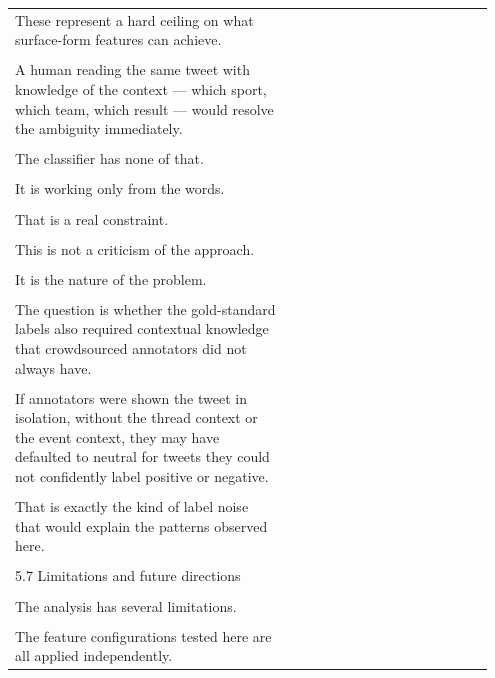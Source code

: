 \documentclass[11pt]{article}
\begin{document}
\begin{longtable}{|p{0.55\linewidth}|p{0.40\linewidth}|}
\hline
\rule{0pt}{3.5cm} & \\
\hline
These represent a hard ceiling on what surface-form features can achieve. & \\[2pt]
\hline
\rule{0pt}{3.5cm} & \\
\hline
A human reading the same tweet with knowledge of the context --- which sport, which team, which result --- would resolve the ambiguity immediately. & \\[2pt]
\hline
\rule{0pt}{3.5cm} & \\
\hline
The classifier has none of that. & \\[2pt]
\hline
\rule{0pt}{3.5cm} & \\
\hline
It is working only from the words. & \\[2pt]
\hline
\rule{0pt}{3.5cm} & \\
\hline
That is a real constraint. & \\[2pt]
\hline
\rule{0pt}{3.5cm} & \\
\hline
This is not a criticism of the approach. & \\[2pt]
\hline
\rule{0pt}{3.5cm} & \\
\hline
It is the nature of the problem. & \\[2pt]
\hline
\rule{0pt}{3.5cm} & \\
\hline
The question is whether the gold-standard labels also required contextual knowledge that crowdsourced annotators did not always have. & \\[2pt]
\hline
\rule{0pt}{3.5cm} & \\
\hline
If annotators were shown the tweet in isolation, without the thread context or the event context, they may have defaulted to neutral for tweets they could not confidently label positive or negative. & \\[2pt]
\hline
\rule{0pt}{3.5cm} & \\
\hline
That is exactly the kind of label noise that would explain the patterns observed here. & \\[2pt]
\hline
\rule{0pt}{3.5cm} & \\
\hline
5.7 Limitations and future directions & \\[2pt]
\hline
\rule{0pt}{3.5cm} & \\
\hline
The analysis has several limitations. & \\[2pt]
\hline
\rule{0pt}{3.5cm} & \\
\hline
The feature configurations tested here are all applied independently. & \\[2pt]

\end{longtable}
\end{document}
